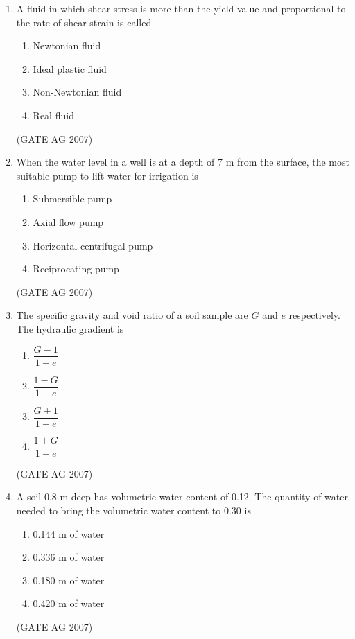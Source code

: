 \documentclass[journal,12pt,onecolumn]{IEEEtran}
\theoremstyle{remark}
\begin{document}
\begin{enumerate}
\item  A fluid in which shear stress is more than the yield value and proportional to the rate of shear strain is called
\begin{multicols}{4}
\begin{enumerate}
    \item Newtonian fluid
     \item  Ideal plastic fluid
    \item Non-Newtonian fluid
    \item Real fluid
\end{enumerate}
\end{multicols}
\hfill(GATE AG 2007)


\item  When the water level in a well is at a depth of 7 m from the surface, the most suitable pump to lift water for irrigation is
\begin{multicols}{4}
\begin{enumerate}
    \item Submersible pump
    \item Axial flow pump
    \item Horizontal centrifugal pump
    \item Reciprocating pump
\end{enumerate}
\end{multicols}
\hfill(GATE AG 2007)


\item  The specific gravity and void ratio of a soil sample are $G$ and $e$ respectively. The hydraulic gradient is
\begin{multicols}{4}
\begin{enumerate}
    \item $\dfrac{G - 1}{1 + e}$
    
    \item $\dfrac{1 - G}{1 + e}$
    \item $\dfrac{G + 1}{1 - e}$
    
    \item $\dfrac{1 + G}{1 + e}$
\end{enumerate}
\end{multicols}
\hfill(GATE AG 2007)


\item  A soil 0.8 m deep has volumetric water content of 0.12. The quantity of water needed to bring the volumetric water content to 0.30 is
\begin{multicols}{4}
\begin{enumerate}
    \item 0.144 m of water
    \item 0.336 m of water
    \item 0.180 m of water
    \item 0.420 m of water
\end{enumerate}
\end{multicols}
\hfill(GATE AG 2007)


\end{enumerate}
\end{document}
